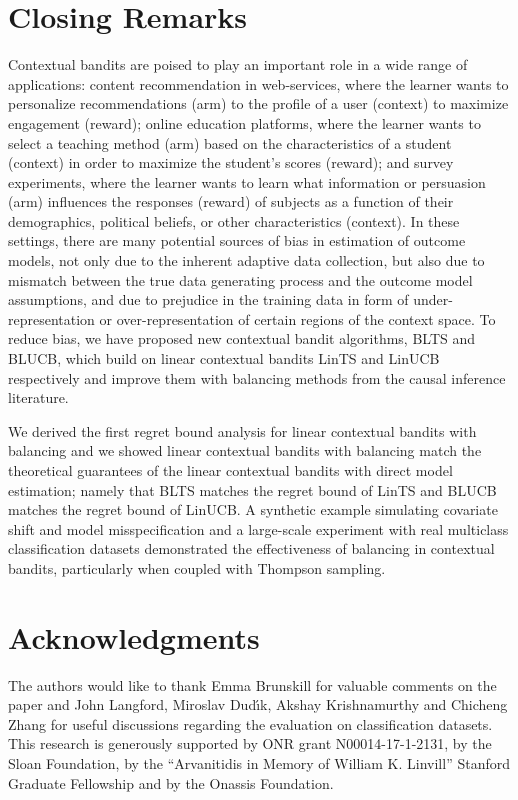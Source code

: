 \documentclass[letterpaper]{article} %
\begin{document}
\section{Closing Remarks}
Contextual bandits are poised to play an important role in a wide range of applications:
content recommendation in web-services, where the learner wants to personalize recommendations (arm) to the profile of a user (context) to maximize engagement (reward);  online education platforms, where the learner wants to select a teaching method (arm) based on the characteristics of a student (context) in order to maximize the student's scores (reward); and survey experiments, where the learner wants to learn what information or persuasion (arm) influences the responses (reward) of subjects as a function of their demographics, political beliefs, or other characteristics (context).
In these settings, there are many potential sources of bias in estimation of outcome models, not only due to the inherent adaptive data collection, but also due to mismatch between the true data generating process and the outcome model assumptions, and due to prejudice in the training data in form of under-representation or over-representation of certain regions of the context space.
To reduce bias, we have proposed new contextual bandit algorithms, BLTS and BLUCB, which build on linear contextual bandits LinTS and LinUCB respectively and improve them with balancing methods from the causal inference literature. 

We derived the first regret bound analysis for linear contextual bandits with balancing and we showed linear contextual bandits with balancing match the theoretical guarantees of the linear contextual bandits with direct model estimation; namely that BLTS matches the regret bound of LinTS and BLUCB matches the regret bound of LinUCB.
A synthetic example simulating covariate shift and model misspecification and a large-scale experiment with real multiclass classification datasets demonstrated the effectiveness of balancing in contextual bandits, particularly when coupled with Thompson sampling.


\section{Acknowledgments}
The authors would like to thank Emma Brunskill for valuable comments on the paper and John Langford, Miroslav Dud{\'\i}k, Akshay Krishnamurthy and Chicheng Zhang for useful discussions regarding the evaluation on classification datasets. 
This research is generously supported by ONR grant N00014-17-1-2131, by the Sloan Foundation, by the ``Arvanitidis in Memory of William K. Linvill'' Stanford Graduate Fellowship and by the Onassis Foundation.

\fontsize{9.5pt}{10.5pt} \selectfont


\end{document}
